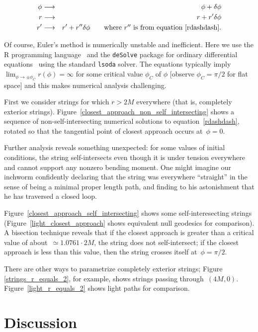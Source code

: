 \documentclass[review]{elsarticle}
\begin{document}
\begin{eqnarray}
\phi&\longrightarrow&\phi+\delta\phi\nonumber\\
r   &\longrightarrow&r+r'\delta\phi\nonumber\\
r'  &\longrightarrow&r' + r''\delta\phi\qquad\mbox{where $r''$ is from equation~\ref{rdashdash}.}
\end{eqnarray}

Of course, Euler's method is numerically unstable and inefficient.
Here we use the R programming language~\cite{rcore2019} and the
\verb+deSolve+ package for ordinary differential
equations~\cite{soetart2010} using the standard \verb+lsoda+ solver.
The equations typically imply
$\displaystyle\lim_{\phi\longrightarrow\pm\phi_C} r(\phi)=\infty$ for
some critical value $\phi_C$ of $\phi$ [observe $\phi_C=\pi/2$ for
  flat space] and this makes numerical analysis challenging.

First we consider strings for which $r>2M$ everywhere (that is,
completely exterior strings).
Figure~\ref{closest_approach_non_self_intersecting} shows a sequence
of non-self-intersecting numerical solutions to
equation~\ref{rdashdash}, rotated so that the tangential point of
closest approach occurs at~$\phi=0$.

Further analysis reveals something unexpected: for some values of
initial conditions, the string self-intersects even though it is under
tension everywhere and cannot support any nonzero bending moment.  One
might imagine our inchworm confidently declaring that the string was
everywhere ``straight'' in the sense of being a minimal proper length
path, and finding to his astonishment that he has traversed a closed
loop.

Figure~\ref{closest_approach_self_intersecting} shows some
self-interesecting strings (Figure~\ref{light_closest_approach} shows
equivalent null geodesics for comparison).  A bisection technique
reveals that if the closest approach is greater than a critical value
of about~$\simeq 1.0761\cdot 2M$, the string does not self-intersect;
if the closest approach is less than this value, then the string
crosses itself at~$\phi=\pi/2$.

There are other ways to parametrize completely exterior strings;
Figure \ref{strings_r_equals_2}, for example, shows strings passing
through~$(4M,0)$.  Figure~\ref{light_r_equals_2} shows light paths for
comparison.

\section{Discussion}
\end{document}
